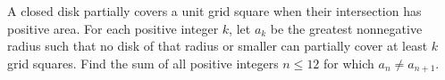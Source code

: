 A closed disk partially covers a unit grid square when their intersection has positive area. For each positive integer $k$, let $a_k$ be the greatest nonnegative radius such that no disk of that radius or smaller can partially cover at least $k$ grid squares. Find the sum of all positive integers $n\le12$ for which $a_n\ne a_{n+1}$.
